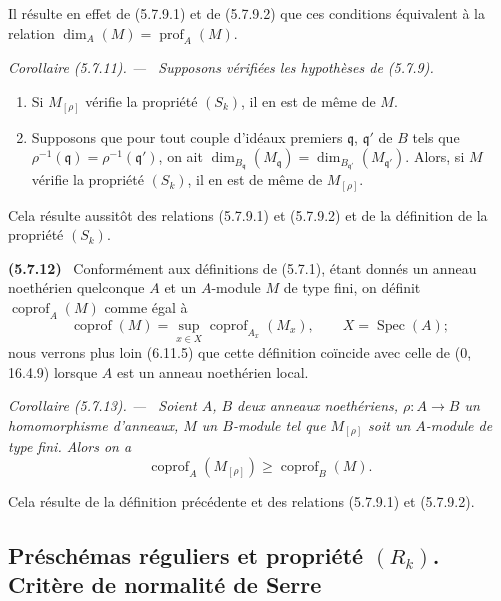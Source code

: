 \documentclass[10pt,oneside]{book}
\newcommand{\oldpage}[2][]{%
  \setcounter{footnote}{0}%
  \marginpar{\scriptsize\textbf{#1}~|~#2}\ignorespaces}
\newenvironment{env}[1][]{\par\medskip\noindent\textbf{(#1)}\ }{\par}
\newenvironment{corollary}[1][]{%
  \par\medskip\noindent\itshape Corollaire (#1). ---\ }{\par}
\begin{document}
Il résulte en effet de (5.7.9.1) et de (5.7.9.2) que ces conditions
équivalent à la relation
$\dim_A(M)=\operatorname{prof}_A(M)$.

\begin{corollary}[5.7.11]
\label{IV.2.s5.7.11-fr}
Supposons vérifiées les hypothèses de (5.7.9).
\begin{enumerate}
\item[(i)] Si $M_{[\rho]}$ vérifie la propriété $(S_k)$, il en est de même
de $M$.
\item[(ii)] Supposons que pour tout couple d'idéaux premiers
$\mathfrak q$, $\mathfrak q'$ de $B$ tels que
$\rho^{-1}(\mathfrak q)=\rho^{-1}(\mathfrak q')$, on ait
$\dim_{B_{\mathfrak q}}(M_{\mathfrak q})
=\dim_{B_{\mathfrak q'}}(M_{\mathfrak q'})$. Alors, si $M$ vérifie la
propriété $(S_k)$, il en est de même de $M_{[\rho]}$.
\end{enumerate}
\end{corollary}

\oldpage[IV-2]{107}

Cela résulte aussitôt des relations (5.7.9.1) et (5.7.9.2) et de la
définition de la propriété $(S_k)$.

\begin{env}[5.7.12]
\label{IV.2.s5.7.12-fr}
Conformément aux définitions de (5.7.1), étant donnés un anneau noethérien
quelconque $A$ et un $A$-module $M$ de type fini, on définit
$\operatorname{coprof}_A(M)$ comme égal à
\[
\operatorname{coprof}(M)=\sup_{x\in X}
\operatorname{coprof}_{A_x}(M_x),\qquad X=\operatorname{Spec}(A);
\]
nous verrons plus loin (6.11.5) que cette définition coïncide avec celle de
(0, 16.4.9) lorsque $A$ est un anneau noethérien local.
\end{env}

\begin{corollary}[5.7.13]
\label{IV.2.s5.7.13-fr}
Soient $A$, $B$ deux anneaux noethériens, $\rho:A\to B$ un homomorphisme
d'anneaux, $M$ un $B$-module tel que $M_{[\rho]}$ soit un $A$-module de type
fini. Alors on a
\begin{equation}
\operatorname{coprof}_A(M_{[\rho]})\geq\operatorname{coprof}_B(M).
\tag{5.7.13.1}\label{IV.2.s5.7.13.1-fr}
\end{equation}
\end{corollary}

Cela résulte de la définition précédente et des relations (5.7.9.1) et
(5.7.9.2).

\subsection{\texorpdfstring{Préschémas réguliers et propriété $(R_k)$. Critère de normalité de Serre}{Préschémas réguliers et propriété (R\string_k). Critère de normalité de Serre}}
\end{document}
